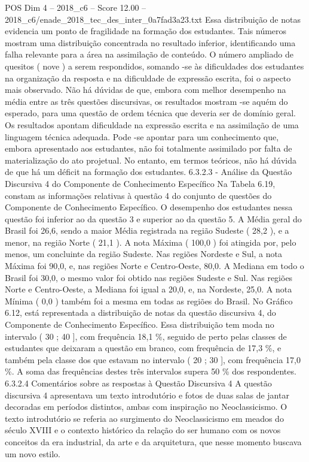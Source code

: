 \begin{textsample}{POS Dim 4 – 2018\_c6 – Score 12.00 – 2018\_c6/enade\_2018\_tec\_des\_inter\_0a7fad3a23.txt}
Essa distribuição de notas evidencia um ponto de fragilidade na formação dos estudantes.
Tais números mostram uma distribuição concentrada no resultado inferior, identificando uma falha relevante para a área na assimilação de conteúdo.
O número ampliado de quesitos ( nove ) a serem respondidos, somando -se às dificuldades dos estudantes na organização da resposta e na dificuldade de expressão escrita, foi o aspecto mais observado.
Não há dúvidas de que, embora com melhor desempenho na média entre as três questões discursivas, os resultados mostram -se aquém do esperado, para uma questão de ordem técnica que deveria ser de domínio geral.
Os resultados apontam dificuldade na expressão escrita e na assimilação de uma linguagem técnica adequada.
Pode -se apontar para um conhecimento que, embora apresentado aos estudantes, não foi totalmente assimilado por falta de materialização do ato projetual.
No entanto, em termos teóricos, não há dúvida de que há um déficit na formação dos estudantes. 6.3.2.3 - Análise da Questão Discursiva 4 do Componente de Conhecimento Específico Na Tabela 6.19, constam as informações relativas à questão 4 do conjunto de questões do Componente de Conhecimento Específico.
O desempenho dos estudantes nessa questão foi inferior ao da questão 3 e superior ao da questão 5.
A Média geral do Brasil foi 26,6, sendo a maior Média registrada na região Sudeste ( 28,2 ), e a menor, na região Norte ( 21,1 ).
A nota Máxima ( 100,0 ) foi atingida por, pelo menos, um concluinte da região Sudeste.
Nas regiões Nordeste e Sul, a nota Máxima foi 90,0, e, nas regiões Norte e Centro-Oeste, 80,0.
A Mediana em todo o Brasil foi 30,0, o mesmo valor foi obtido nas regiões Sudeste e Sul.
Nas regiões Norte e Centro-Oeste, a Mediana foi igual a 20,0, e, na Nordeste, 25,0.
A nota Mínima ( 0,0 ) também foi a mesma em todas as regiões do Brasil.
No Gráfico 6.12, está representada a distribuição de notas da questão discursiva 4, do Componente de Conhecimento Específico.
Essa distribuição tem moda no intervalo ( 30 ; 40 ], com frequência 18,1 \%, seguido de perto pelas classes de estudantes que deixaram a questão em branco, com frequência de 17,3 \%, e também pela classe dos que estavam no intervalo ( 20 ; 30 ], com frequência 17,0 \%.
A soma das frequências destes três intervalos supera 50 \% dos respondentes. 6.3.2.4 Comentários sobre as respostas à Questão Discursiva 4 A questão discursiva 4 apresentava um texto introdutório e fotos de duas salas de jantar decoradas em períodos distintos, ambas com inspiração no Neoclassicismo.
O texto introdutório se referia ao surgimento do Neoclassicismo em meados do século XVIII e o contexto histórico da relação do ser humano com os novos conceitos da era industrial, da arte e da arquitetura, que nesse momento buscava um novo estilo.

\end{textsample}
